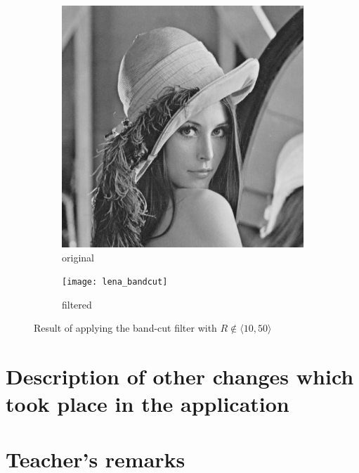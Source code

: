 \documentclass[12pt]{article}
\renewcommand*{\subfiguresize}{.35\textwidth}
\begin{document}
\begin{figure}[H]\centering
    \begin{subfigure}[ht]{\subfiguresize}
        \includegraphics[width=\textwidth]{lena}
        \caption{original}
    \end{subfigure}
    \hspace*{2em}
    \begin{subfigure}[ht]{\subfiguresize}
        \texttt{[image: lena\_bandcut]}
        \caption{filtered}
    \end{subfigure}
    \caption{Result of applying the band-cut filter with $R \notin \langle 10, 50 \rangle$}
\end{figure}

\section{Description of other changes which took place in the application}

\vfill
\section*{Teacher's remarks}
\begin{tabularx}{\textwidth}{|X|}
    \hline
    \vspace{7cm}
    \phantom{.} \\
    \hline
\end{tabularx}
\end{document}
